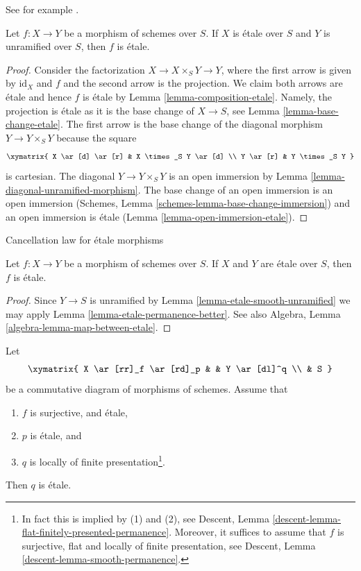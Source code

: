 \begin{lemma}
\label{lemma-etale-permanence-better}
\begin{reference}
See for example \cite[Remark 18.30 (2).]{GWII}.
\end{reference}
Let $f : X \to Y$ be a morphism of schemes over $S$.
If $X$ is \'etale over $S$ and $Y$ is unramified over $S$, then
$f$ is \'etale.
\end{lemma}

\begin{proof}
Consider the factorization $X \to X \times_S Y \to Y$, where the first arrow
is given by $\text{id}_X$ and $f$ and the second arrow is the projection.
We claim both arrows are \'etale and hence $f$ is \'etale by
Lemma \ref{lemma-composition-etale}. Namely, the projection is \'etale
as it is the base change of $X \to S$, see Lemma \ref{lemma-base-change-etale}.
The first arrow is the base change of the diagonal morphism
$Y \to Y \times_S Y$ because the square
$$
\xymatrix{
X \ar[d] \ar[r] & X \times_S Y \ar[d] \\
Y \ar[r] & Y \times_S Y
}
$$
is cartesian. The diagonal $Y \to Y \times_S Y$ is an open immersion by
Lemma \ref{lemma-diagonal-unramified-morphism}. The base change
of an open immersion is an open immersion
(Schemes, Lemma \ref{schemes-lemma-base-change-immersion})
and an open immersion is \'etale
(Lemma \ref{lemma-open-immersion-etale}).
\end{proof}

\begin{lemma}
\label{lemma-etale-permanence}
\begin{slogan}
Cancellation law for \'etale morphisms
\end{slogan}
Let $f : X \to Y$ be a morphism of schemes over $S$.
If $X$ and $Y$ are \'etale over $S$, then
$f$ is \'etale.
\end{lemma}

\begin{proof}
Since $Y \to S$ is unramified by Lemma \ref{lemma-etale-smooth-unramified}
we may apply Lemma \ref{lemma-etale-permanence-better}. See also
Algebra, Lemma \ref{algebra-lemma-map-between-etale}.
\end{proof}

\begin{lemma}
\label{lemma-etale-permanence-two}
Let
$$
\xymatrix{
X \ar[rr]_f \ar[rd]_p & &
Y \ar[dl]^q \\
& S
}
$$
be a commutative diagram of morphisms of schemes. Assume that
\begin{enumerate}
\item $f$ is surjective, and \'etale,
\item $p$ is \'etale, and
\item $q$ is locally of finite presentation\footnote{In fact this
is implied by (1) and (2), see
Descent, Lemma \ref{descent-lemma-flat-finitely-presented-permanence}.
Moreover, it suffices to assume that $f$ is surjective, flat and
locally of finite presentation, see
Descent, Lemma \ref{descent-lemma-smooth-permanence}.}.
\end{enumerate}
Then $q$ is \'etale.
\end{lemma}

